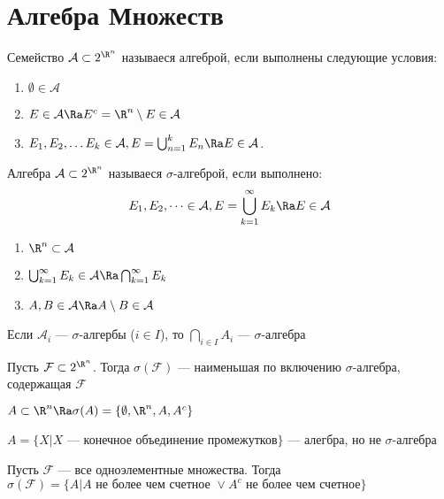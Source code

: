 \section{Алгебра Множеств}
\begin{definition}
    Семейство \(\mathcal{A} \subset 2^{\R^n}\) называеся алгеброй, если выполнены следующие условия:
    \begin{enumerate}
        \item \(\emptyset \in \mathcal{A}\)
        \item \(E \in \mathcal{A} \Ra E^c = \R^n \setminus E \in \mathcal{A}\)
        \item \(E_1, E_2, \dots E_k \in \mathcal{A}, E = \bigcup^k_{n = 1} E_n \Ra E \in \mathcal{A}\).
    \end{enumerate}
\end{definition}

\begin{definition}
    Алгебра \(\mathcal{A} \subset 2^{\R^n}\) называеся \(\sigma\)-алгеброй, если выполнено:
    \[E_1, E_2, \dots \in \mathcal{A}, E = \bigcup^\infty_{k = 1} E_k \Ra E \in \mathcal{A}\]
\end{definition}

\begin{note}
    \begin{enumerate}
        \item \(\R^n \subset \mathcal{A}\)
        \item \(\bigcup^\infty_{k = 1} E_k \in \mathcal{A} \Ra \bigcap^\infty_{k = 1} E_k\)
        \item \(A, B \in \mathcal{A} \Ra A \setminus B \in \mathcal{A}\)
    \end{enumerate}
\end{note}

\begin{note}
    Если \(\mathcal{A}_i\) --- \(\sigma\)-алгербы (\(i \in I\)), то \(\bigcap_{i \in I} A_i\) --- \(\sigma\)-алгебра
\end{note}

\begin{definition}
    Пусть \(\mathcal{F} \subset 2^{\R^n}\). Тогда \(\sigma(\mathcal{F})\) --- наименьшая по включению \(\sigma\)-алгебра, содержащая \(\mathcal{F}\)
\end{definition}

\begin{example}
    \(A \subset \R^n \Ra \sigma(A) = \{\emptyset, \R^n, A, A^c\}\)
\end{example}
\begin{example}
    \(A = \{X | X \text{ --- конечное объединение промежутков}\}\) --- алегбра, но не \(\sigma\)-алгебра
\end{example}
\begin{example}
    Пусть \(\mathcal{F}\) --- все одноэлементные множества. Тогда 
    \(\sigma(\mathcal{F}) = \{A | A \text{ не более чем счетное } \vee A^c \text{ не более чем счетное}\}\)
\end{example}

